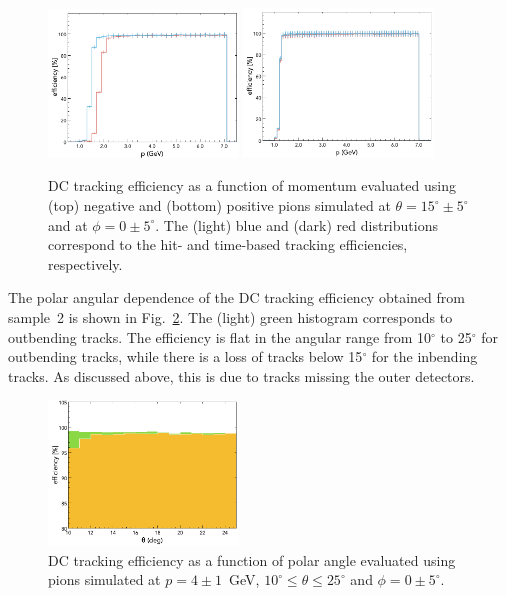 \begin{figure}[t]
\includegraphics[width=0.45\textwidth]{pics/DCTrkgEffNegTrks.png}
\includegraphics[width=0.45\textwidth]{pics/DCTrkgEffPosTrks.png}
\caption{DC tracking efficiency as a function of momentum evaluated using  (top) negative and (bottom) positive pions
  simulated at $\theta =15^\circ \pm 5^\circ$ and at $\phi = 0 \pm 5^\circ$. The (light) blue and (dark) red distributions
  correspond to the hit- and time-based tracking efficiencies, respectively.}
\label{fig:trkeff}
\end{figure}

The polar angular dependence of the DC tracking efficiency obtained from sample~2 is shown in
Fig.~\ref{fig:trkeffinoutb}. The (light) green histogram corresponds to outbending tracks. The efficiency is flat
in the angular range from 10$^\circ$ to 25$^\circ$ for outbending tracks, while there is a loss of tracks below
15$^\circ$ for the inbending tracks. As discussed above, this is due to tracks missing the outer detectors.  

\begin{figure}[t]
\includegraphics[width=0.45\textwidth]{pics/DCTrkEffvsThetaInandOutbenders.png}
\caption{DC tracking efficiency as a function of polar angle evaluated using  pions  simulated at $p=4\pm 1$~GeV,
  $10^\circ \leq \theta \leq 25^\circ$ and $\phi = 0 \pm 5^\circ$.}
\label{fig:trkeffinoutb}
\end{figure}

